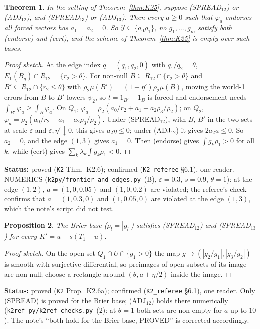\documentclass[11pt]{article}
\newtheorem{theorem}{Theorem}[section]
\newtheorem{proposition}[theorem]{Proposition}
\theoremstyle{definition}
\theoremstyle{remark}
\newcommand{\src}[1]{\texttt{#1}}
\newcommand{\status}[1]{\par\smallskip\noindent\textbf{Status:} #1\par\smallskip}
\begin{document}
\begin{theorem}\label{thm:K26}
In the setting of Theorem~\ref{thm:K25}, suppose (SPREAD$_{12}$) or (ADJ$_{12}$), and (SPREAD$_{13}$) or (ADJ$_{13}$). Then every $a\ge0$ such that $\varphi_a$ endorses all forced vectors has $a_1=a_2=0$. So $\mathcal Y\subseteq\{a_0\rho_1\}$, no $g_1,\dots,g_m$ satisfy both (endorse) and (cert), and the scheme of Theorem~\ref{thm:K25} is empty over such bases.
\end{theorem}
\begin{proof}[Proof sketch]
At the edge index $q=(q_1,q_2,0)$ with $q_1/q_2=\theta$, $E_1(B_q)\cap R_{12}=\{r_2>\theta\}$. For non-null $B\subseteq R_{12}\cap\{r_2>\theta\}$ and $B'\subseteq R_{12}\cap\{r_2\le\theta\}$ with $\rho_2\mu(B')=(1+\eta')\rho_2\mu(B)$, moving the world-1 errors from $B$ to $B'$ lowers $\psi_2$, so $t=1_{B'}-1_B$ is forced and endorsement needs $\int_{B'}\varphi_a\ge\int_B\varphi_a$. On $Q_1$, $\varphi_a=\rho_2(a_0/r_2+a_1+a_2\rho_3/\rho_2)$; on $Q_2$, $\varphi_a=\rho_2(a_0/r_2+a_1-a_2\rho_3/\rho_2)$. Under (SPREAD$_{12}$), with $B$, $B'$ in the two sets at scale $\varepsilon$ and $\varepsilon,\eta'\downarrow0$, this gives $a_2\eta\le0$; under (ADJ$_{12}$) it gives $2a_2a\le0$. So $a_2=0$, and the edge $(1,3)$ gives $a_1=0$. Then (endorse) gives $\int g_k\rho_1>0$ for all $k$, while (cert) gives $\sum_k\lambda_k\int g_k\rho_1<0$.
\end{proof}
\status{proved (\src{K2} Thm.~K2.6); confirmed (\src{K2\_referee} \S6.1), one reader. NUMERICS (\src{k2py/frontier\_and\_edges.py}~(B), $\varepsilon=0.3$, $s=0.9$, $\theta=1$): at the edge $(1,2)$, $a=(1,0,0.05)$ and $(1,0,0.2)$ are violated; the referee's check confirms that $a=(1,0.3,0)$ and $(1,0.05,0)$ are violated at the edge $(1,3)$, which the note's script did not test.}

\begin{proposition}\label{prop:K26a}
The Brier base ($\rho_l=|g_l|$) satisfies (SPREAD$_{12}$) and (SPREAD$_{13}$) for every $K'=u+s(T_1-u)$.
\end{proposition}
\begin{proof}[Proof sketch]
On the open set $Q_1\cap U\cap\{g_1>0\}$ the map $g\mapsto(|g_2/g_1|,|g_3/g_2|)$ is smooth with surjective differential, so preimages of open subsets of its image are non-null; choose a rectangle around $(\theta,a+\eta/2)$ inside the image.
\end{proof}
\status{proved (\src{K2} Prop.~K2.6a); confirmed (\src{K2\_referee} \S6.1), one reader. Only (SPREAD) is proved for the Brier base; (ADJ$_{12}$) holds there numerically (\src{k2ref\_py/k2ref\_checks.py}~(2): at $\theta=1$ both sets are non-empty for $a$ up to $10$). The note's ``both hold for the Brier base, PROVED'' is corrected accordingly.}
\end{document}
